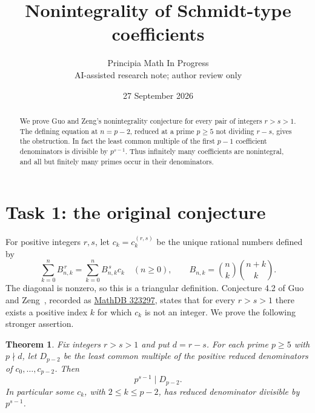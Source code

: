 \documentclass[11pt]{article}
\title{Nonintegrality of Schmidt-type coefficients}
\author{Principia Math In Progress\\\small AI-assisted research note; author review only}
\date{27 September 2026}
\newtheorem{theorem}{Theorem}
\begin{document}
\maketitle
\begin{abstract}
We prove Guo and Zeng's nonintegrality conjecture for every pair of integers
$r>s>1$. The defining equation at $n=p-2$, reduced at a prime
$p\ge5$ not dividing $r-s$, gives the obstruction. In fact the least common
multiple of the first $p-1$ coefficient denominators is divisible by
$p^{s-1}$. Thus infinitely many coefficients are nonintegral, and all but
finitely many primes occur in their denominators.
\end{abstract}

\section*{Task 1: the original conjecture}
For positive integers $r,s$, let $c_k=c_k^{(r,s)}$ be the unique rational
numbers defined by
\begin{equation}\label{eq:definition}
 \sum_{k=0}^n B_{n,k}^{\,r}
 =\sum_{k=0}^n B_{n,k}^{\,s}c_k\quad(n\ge0),\qquad
 B_{n,k}=\binom nk\binom{n+k}{k}.
\end{equation}
The diagonal is nonzero, so this is a triangular definition.
Conjecture 4.2 of Guo and Zeng~\cite{GZ}, recorded as
\href{https://mathdb.com/p/323297}{MathDB 323297}, states that for every
$r>s>1$ there exists a positive index $k$ for which $c_k$ is not an integer.
We prove the following stronger assertion.

\begin{theorem}\label{thm:denom}
Fix integers $r>s>1$ and put $d=r-s$. For each prime $p\ge5$ with $p\nmid d$,
let $D_{p-2}$ be the least common multiple of the positive reduced
denominators of $c_0,\ldots,c_{p-2}$. Then
\[
 p^{s-1}\mid D_{p-2}.
\]
In particular some $c_k$, with $2\le k\le p-2$, has reduced denominator
divisible by $p^{s-1}$.
\end{theorem}
\end{document}
